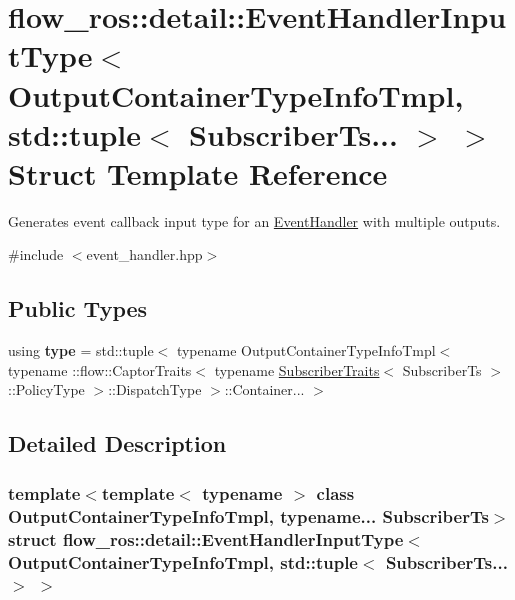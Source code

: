 \hypertarget{structflow__ros_1_1detail_1_1_event_handler_input_type_3_01_output_container_type_info_tmpl_00_0ffddcead573ab44a62afad7bf9d6e18f}{}\section{flow\+\_\+ros\+:\+:detail\+:\+:Event\+Handler\+Input\+Type$<$ Output\+Container\+Type\+Info\+Tmpl, std\+:\+:tuple$<$ Subscriber\+Ts... $>$ $>$ Struct Template Reference}
\label{structflow__ros_1_1detail_1_1_event_handler_input_type_3_01_output_container_type_info_tmpl_00_0ffddcead573ab44a62afad7bf9d6e18f}


Generates event callback input type for an \hyperlink{classflow__ros_1_1_event_handler}{Event\+Handler} with multiple outputs.  




{\ttfamily \#include $<$event\+\_\+handler.\+hpp$>$}

\subsection*{Public Types}
\begin{DoxyCompactItemize}
\item 
\mbox{\label{structflow__ros_1_1detail_1_1_event_handler_input_type_3_01_output_container_type_info_tmpl_00_0ffddcead573ab44a62afad7bf9d6e18f_ada295a642648ff82f3544e8d00817b6a}} 
using {\bfseries type} = std\+::tuple$<$ typename Output\+Container\+Type\+Info\+Tmpl$<$ typename \+::flow\+::\+Captor\+Traits$<$ typename \hyperlink{structflow__ros_1_1_subscriber_traits}{Subscriber\+Traits}$<$ Subscriber\+Ts $>$\+::Policy\+Type $>$\+::Dispatch\+Type $>$\+::Container... $>$
\end{DoxyCompactItemize}


\subsection{Detailed Description}
\subsubsection*{template$<$template$<$ typename $>$ class Output\+Container\+Type\+Info\+Tmpl, typename... Subscriber\+Ts$>$\newline
struct flow\+\_\+ros\+::detail\+::\+Event\+Handler\+Input\+Type$<$ Output\+Container\+Type\+Info\+Tmpl, std\+::tuple$<$ Subscriber\+Ts... $>$ $>$}

